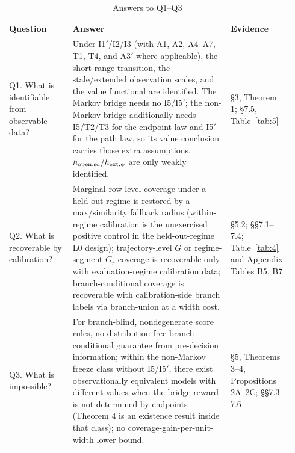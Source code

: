 \begin{table}[!ht]
\centering
\scriptsize
\caption{Answers to Q1--Q3}
\label{tab:8}
\begin{tabular}{@{}>{\raggedright\arraybackslash}p{0.21\linewidth}>{\raggedright\arraybackslash}p{0.52\linewidth}>{\raggedright\arraybackslash}p{0.21\linewidth}@{}}
\toprule
Question & Answer & Evidence \\
\midrule
Q1. What is identifiable from observable data? & Under I1$'$/I2/I3 (with A1, A2, A4--A7, T1, T4, and A3$'$ where applicable), the short-range transition, the stale/extended observation scales, and the value functional are identified. The Markov bridge needs no I5/I5$'$; the non-Markov bridge additionally needs I5/T2/T3 for the endpoint law and I5$'$ for the path law, so its value conclusion carries those extra assumptions. $h_{\rm open,sd}/h_{\rm ext,\phi}$ are only weakly identified. & \S3, Theorem 1; \S7.5, Table~\ref{tab:5} \\
Q2. What is recoverable by calibration? & Marginal row-level coverage under a held-out regime is restored by a max/similarity fallback radius (within-regime calibration is the unexercised positive control in the held-out-regime L0 design); trajectory-level $G$ or regime-segment $G_r$ coverage is recoverable only with evaluation-regime calibration data; branch-conditional coverage is recoverable with calibration-side branch labels via branch-union at a width cost. & \S5.2; \S\S7.1--7.4; Table~\ref{tab:4} and Appendix Tables B5, B7 \\
Q3. What is impossible? & For branch-blind, nondegenerate score rules, no distribution-free branch-conditional guarantee from pre-decision information; within the non-Markov freeze class without I5/I5$'$, there exist observationally equivalent models with different values when the bridge reward is not determined by endpoints (Theorem 4 is an existence result inside that class); no coverage-gain-per-unit-width lower bound. & \S5, Theorems 3--4, Propositions 2A--2C; \S\S7.3--7.6 \\
\bottomrule
\end{tabular}
\vspace{0.5em}
\end{table}
